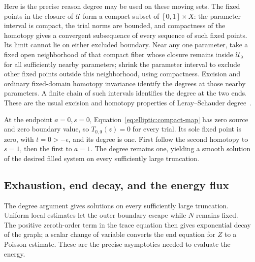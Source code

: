 Here is the precise reason degree may be used on these moving sets.
The fixed points in the closure of $\mathcal U$ form a compact subset of
$[0,1]\times X$: the parameter interval is compact, the trial norms
are bounded, and compactness of the homotopy gives a convergent
subsequence of every sequence of such fixed points.  Its limit cannot lie on either excluded boundary.  Near any one parameter, take a fixed open
neighborhood of that compact fiber whose closure remains inside
$\mathcal U_\lambda$ for all sufficiently nearby parameters; shrink
the parameter interval to exclude other fixed points outside this
neighborhood, using compactness.  Excision and ordinary fixed-domain
homotopy invariance identify the degrees at those nearby parameters.
A finite chain of such intervals identifies the degree at the two
ends.  These are the usual excision and homotopy properties of
Leray--Schauder degree~\cite[Chapter~2]{Deimling1985}.

At the endpoint $a=0,s=0$, Equation~\eqref{eq:elliptic:compact-map}
has zero source and zero boundary value, so $T_{0,0}(z)=0$ for every
trial.  Its sole fixed point is zero, with $t=0>-\epsilon$, and its
degree is one.  First follow the second homotopy to $s=1$, then the
first to $a=1$.  The degree remains one, yielding a smooth solution
of the desired filled system on every sufficiently large truncation.

\subsection{Exhaustion, end decay, and the energy flux}

The degree argument gives solutions on every sufficiently large
truncation.  Uniform local estimates let the outer boundary escape
while $N$ remains fixed.  The positive zeroth-order term in the trace
equation then gives exponential decay of the graph; a scalar change
of variable converts the end equation for $Z$ to a Poisson estimate.
These are the precise asymptotics needed to evaluate the energy.

